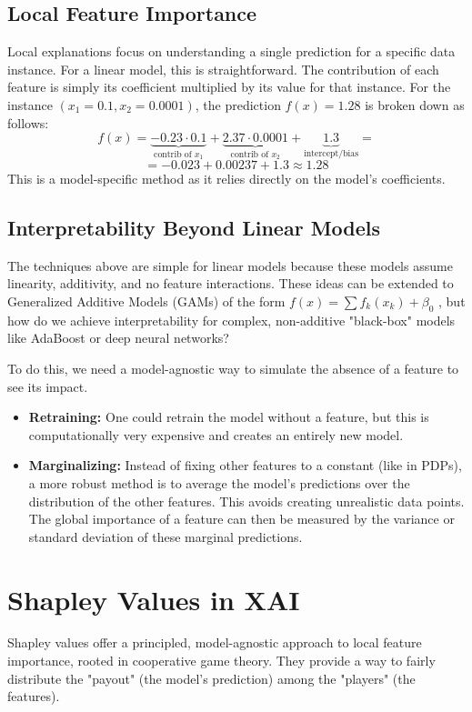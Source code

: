 \documentclass{article}
\begin{document}
\begin{multicols}{2}
	\subsection{Local Feature Importance}
	Local explanations focus on understanding a single prediction for a specific data instance. For a linear model, this is straightforward. The contribution of each feature is simply its coefficient multiplied by its value for that instance. For the instance $(x_1=0.1, x_2=0.0001)$, the prediction $f(x)=1.28$ is broken down as follows:
	$$ f(x) = \underbrace{-0.23 \cdot 0.1}_{\text{contrib of } x_1} + \underbrace{2.37 \cdot 0.0001}_{\text{contrib of } x_2} + \underbrace{1.3}_{\text{intercept/bias}} =$$
	$$= -0.023 + 0.00237 + 1.3 \approx 1.28 $$
	This is a model-specific method as it relies directly on the model's coefficients.


	\subsection{Interpretability Beyond Linear Models}
	The techniques above are simple for linear models because these models assume linearity, additivity, and no feature interactions. These ideas can be extended to Generalized Additive Models (GAMs) of the form $f(x) = \sum f_k(x_k) + \beta_0$ , but how do we achieve interpretability for complex, non-additive "black-box" models like AdaBoost or deep neural networks?

	To do this, we need a model-agnostic way to simulate the absence of a feature to see its impact.
	\begin{itemize}
		\item \textbf{Retraining:} One could retrain the model without a feature, but this is computationally very expensive and creates an entirely new model.
		\item \textbf{Marginalizing:} Instead of fixing other features to a constant (like in PDPs), a more robust method is to average the model's predictions over the distribution of the other features. This avoids creating unrealistic data points. The global importance of a feature can then be measured by the variance or standard deviation of these marginal predictions.
	\end{itemize}

	\section{Shapley Values in XAI}
	Shapley values offer a principled, model-agnostic approach to local feature importance, rooted in cooperative game theory. They provide a way to fairly distribute the "payout" (the model's prediction) among the "players" (the features).


\end{multicols}
\end{document}
